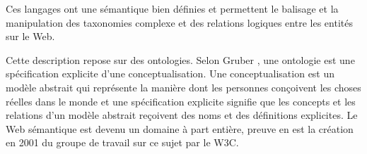 Ces langages ont une sémantique bien définies et permettent le balisage
et la manipulation des taxonomies complexe et des relations logiques
entre les entités sur le Web. \cite{fensel2000creating}

% 

Cette description repose sur des ontologies. Selon Gruber
\cite{gruber1993translation}, une ontologie est une spécification
explicite d'une conceptualisation. Une conceptualisation est un modèle
abstrait qui représente la manière dont les personnes conçoivent les
choses réelles dans le monde     et une spécification explicite signifie
que les concepts et les relations d'un modèle abstrait reçoivent des
noms et des définitions explicites. Le Web sémantique est devenu un
domaine à part entière, preuve en est la création en 2001 du groupe de
travail sur ce sujet par le \textsc{W3C}.

